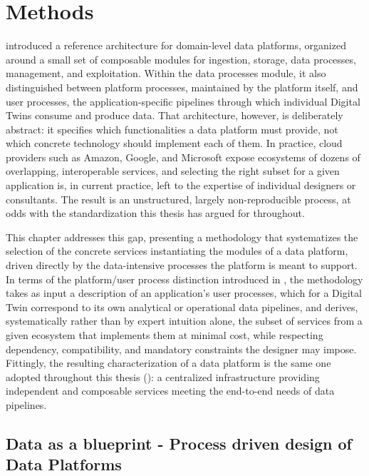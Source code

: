 \chapter{Methods}
\label{chap:methods}
{\color{red}
 introduced a reference architecture for domain-level data platforms, organized around a small set of composable modules for ingestion, storage, data processes, management, and exploitation. Within the data processes module, it also distinguished between platform processes, maintained by the platform itself, and user processes, the application-specific pipelines through which individual Digital Twins consume and produce data. That architecture, however, is deliberately abstract: it specifies which functionalities a data platform must provide, not which concrete technology should implement each of them. In practice, cloud providers such as Amazon, Google, and Microsoft expose ecosystems of dozens of overlapping, interoperable services, and selecting the right subset for a given application is, in current practice, left to the expertise of individual designers or consultants. The result is an unstructured, largely non-reproducible process, at odds with the standardization this thesis has argued for throughout.

This chapter addresses this gap, presenting a methodology that systematizes the selection of the concrete services instantiating the modules of a data platform, driven directly by the data-intensive processes the platform is meant to support. In terms of the platform/user process distinction introduced in , the methodology takes as input a description of an application's user processes, which for a Digital Twin correspond to its own analytical or operational data pipelines, and derives, systematically rather than by expert intuition alone, the subset of services from a given ecosystem that implements them at minimal cost, while respecting dependency, compatibility, and mandatory constraints the designer may impose. Fittingly, the resulting characterization of a data platform is the same one adopted throughout this thesis (): a centralized infrastructure providing independent and composable services meeting the end-to-end needs of data pipelines.
}

\section{Data as a blueprint - Process driven design of Data Platforms}
\label{sec:process-driven-design}


